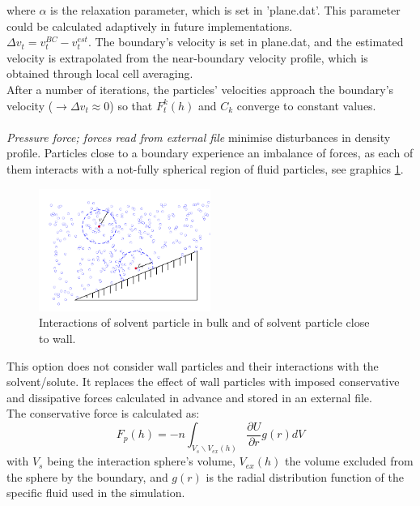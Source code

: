where $\alpha$ is the relaxation parameter, which is set in 'plane.dat'. This parameter could be calculated adaptively in future implementations.\\$\Delta v_t = v_t^{ BC} - v_t^{ est}$. The boundary's velocity is set in plane.dat, and the estimated velocity is extrapolated from the near-boundary velocity profile, which is obtained through local cell averaging.\\After a number of iterations, the particles' velocities approach the boundary's velocity ($\longrightarrow \Delta v_t \approx 0$) so that $F_t^k(h)$ and $C_k$ converge to constant values.\\
\\
\textit{Pressure force; forces read from external file} minimise disturbances in density profile. Particles close to a boundary experience an imbalance of forces, as each of them interacts with a not-fully spherical region of fluid particles, see graphics \ref{fig:wallNeighbours}.

\begin{figure}
\includegraphics[width=0.5\textwidth]{wallNeighbours.pdf}
\caption{Interactions of solvent particle in bulk and of solvent particle close to wall.\label{fig:wallNeighbours}}
\end{figure}

This option does not consider wall particles and their interactions with the solvent/solute. It replaces the effect of wall particles with imposed conservative and dissipative forces calculated in advance and stored in an external file.\\The conservative force is calculated as:
\begin{equation}
\label{eq:wall_cons_force}
F_p(h) = -n \int_{V_s\backslash V_{ex}(h)} \frac{\partial U}{\partial r} g(r) dV
\end{equation}
with $V_s$ being the interaction sphere's volume, $V_{ex}(h)$ the volume excluded from the sphere by the boundary, and $g(r)$ is the radial distribution function of the specific fluid used in the simulation.



